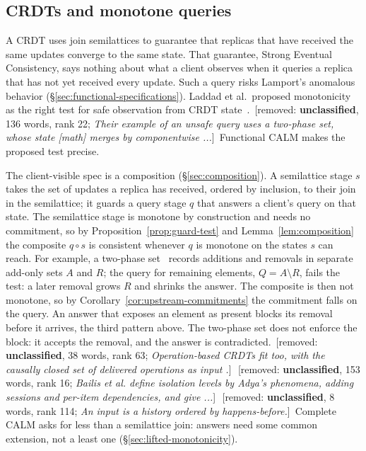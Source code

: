 \documentclass[sigconf]{cidr-2027}
\theoremstyle{remark}
\newcommand{\commitment}{commitment\xspace}
\newcommand{\removednote}[1]{{\color{cutred}\footnotesize\,[removed: #1]\,}}
\begin{document}
\subsection{CRDTs and monotone queries}
\label{sec:crdt-instance}


\textcolor{newblue}{A CRDT uses join semilattices to guarantee that replicas that have received
the same updates converge to the same state.} \textcolor{newblue}{That guarantee, Strong Eventual
Consistency, says nothing about what a client observes when it queries a
replica that has not yet received every update.} \textcolor{newblue}{Such a query risks Lamport's anomalous behavior
(\S\ref{sec:functional-specifications}).} Laddad et al.\ proposed
monotonicity as the right test for safe observation from CRDT
state~\cite{laddad2022keep}. \removednote{\textbf{unclassified}, 136 words, rank 22; \textit{Their example of an unsafe query uses a two-phase set, whose state [math] merges by componentwise ...}} \textcolor{newblue}{Functional CALM makes the proposed test precise.}

\textcolor{newblue}{The client-visible spec is a composition (\S\ref{sec:composition}).} \textcolor{newblue}{A semilattice
stage $s$ takes the set of updates a replica has received, ordered by
inclusion, to their join in the semilattice; it guards a query stage $q$ that
answers a client's query on that state.} \textcolor{newblue}{The semilattice stage is monotone by
construction and needs no \commitment, so by Proposition~\ref{prop:guard-test}
and Lemma~\ref{lem:composition} the composite $q\circ s$ is consistent whenever
$q$ is monotone on the states $s$ can reach.} \textcolor{newblue}{For example, a two-phase
set~\cite{shapiro2011crdt} records additions and removals in separate add-only
sets $A$ and $R$; the query for remaining elements, $Q=A\setminus R$, fails the
test: a later removal grows $R$ and shrinks the answer.} \textcolor{newblue}{The composite is then not monotone, so by
Corollary~\ref{cor:upstream-commitments} the \commitment falls on the query.} \textcolor{newblue}{An
answer that exposes an element as present blocks its removal before it arrives,
the third pattern above.} \textcolor{newblue}{The two-phase set does not enforce the block: it
accepts the removal, and the answer is contradicted.} \removednote{\textbf{unclassified}, 38 words, rank 63; \textit{Operation-based CRDTs fit too, with the causally closed set of delivered operations as input .}} \removednote{\textbf{unclassified}, 153 words, rank 16; \textit{Bailis et al. define isolation levels by Adya's phenomena, adding sessions and per-item dependencies, and give ...}} \removednote{\textbf{unclassified}, 8 words, rank 114; \textit{An input is a history ordered by happens-before.}} \textcolor{newblue}{Complete CALM asks for
less than a semilattice join: answers need some common extension, not a least one
(\S\ref{sec:lifted-monotonicity}).}
\end{document}

